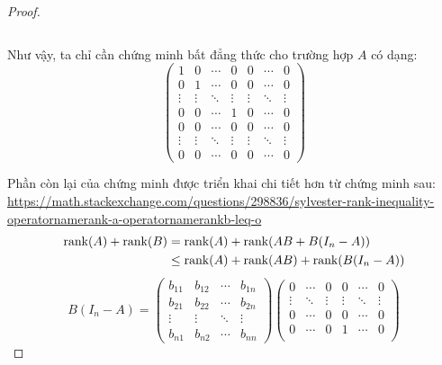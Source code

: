 \documentclass[class=linearalgebra,crop=false]{standalone}
\begin{document}
\begin{proof}
\begin{itemize}
\[              \]
    \end{itemize}
    \par Như vậy, ta chỉ cần chứng minh bất đẳng thức cho trường hợp $A$ có dạng:
    \[
        \begin{pmatrix}
            1      & 0      & \cdots & 0      & 0      & \cdots & 0      \\
            0      & 1      & \cdots & 0      & 0      & \cdots & 0      \\
            \vdots & \vdots & \ddots & \vdots & \vdots & \ddots & \vdots \\
            0      & 0      & \cdots & 1      & 0      & \cdots & 0      \\
            0      & 0      & \cdots & 0      & 0      & \cdots & 0      \\
            \vdots & \vdots & \ddots & \vdots & \vdots & \ddots & \vdots \\
            0      & 0      & \cdots & 0      & 0      & \cdots & 0
        \end{pmatrix}
    \]
    \par Phần còn lại của chứng minh được triển khai chi tiết hơn từ chứng minh sau: \url{https://math.stackexchange.com/questions/298836/sylvester-rank-inequality-operatornamerank-a-operatornamerankb-leq-o}
    \begin{align*}
        \text{rank}(A) + \text{rank}(B) & = \text{rank}(A) + \text{rank}(AB + B(I_{n} - A))          \\
                            & \le \text{rank}(A) + \text{rank}(AB) + \text{rank}(B(I_{n} - A))
    \end{align*}
    \[
        B(I_{n} - A) =
        \begin{pmatrix}
            b_{11} & b_{12} & \cdots & b_{1n} \\
            b_{21} & b_{22} & \cdots & b_{2n} \\
            \vdots & \vdots & \ddots & \vdots \\
            b_{n1} & b_{n2} & \cdots & b_{nn}
        \end{pmatrix}
        \begin{pmatrix}
            0      & \cdots & 0      & 0      & \cdots & 0      \\
            \vdots & \ddots & \vdots & \vdots & \ddots & \vdots \\
            0      & \cdots & 0      & 0      & \cdots & 0      \\
            0      & \cdots & 0      & 1      & \cdots & 0      \\

\end{pmatrix}\]
\end{proof}
\end{document}
